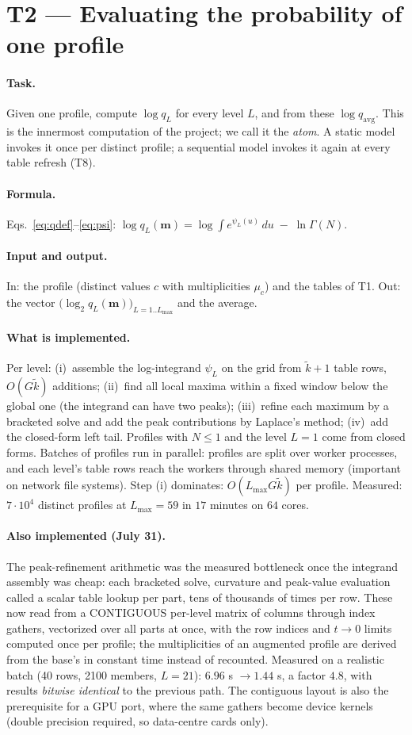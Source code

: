 \documentclass[11pt]{article}
\newcommand{\prof}{\mathbf{m}}
\newcommand{\field}[1]{\paragraph{#1.}}
\begin{document}
\section{T2 --- Evaluating the probability of one profile}

\field{Task}
Given one profile, compute $\log q_L$ for every level $L$, and from
these $\log q_{\mathrm{avg}}$.  This is the innermost computation of
the project; we call it the \emph{atom}.  A static model invokes it
once per distinct profile; a sequential model invokes it again at
every table refresh (T8).

\field{Formula}
Eqs.~\eqref{eq:qdef}--\eqref{eq:psi}:
$\log q_L(\prof) = \log \int e^{\psi_L(u)}\,du \;-\; \ln \Gamma(N)$.

\field{Input and output}
In: the profile (distinct values $c$ with multiplicities $\mu_c$)
and the tables of T1.  Out: the vector
$\bigl(\log_2 q_L(\prof)\bigr)_{L = 1..L_{\max}}$ and the average.

\field{What is implemented}
Per level: (i)~assemble the log-integrand $\psi_L$ on the grid from
$\tilde k + 1$ table rows, $O(G \tilde k)$ additions; (ii)~find all
local maxima within a fixed window below the global one (the
integrand can have two peaks); (iii)~refine each maximum by a
bracketed solve and add the peak contributions by Laplace's method;
(iv)~add the closed-form left tail.  Profiles with $N \le 1$ and the
level $L = 1$ come from closed forms.  Batches of profiles run in
parallel: profiles are split over worker processes, and each level's
table rows reach the workers through shared memory (important on
network file systems).  Step (i) dominates: $O(L_{\max} G \tilde k)$
per profile.  Measured: $7\cdot 10^4$ distinct profiles at
$L_{\max} = 59$ in $17$ minutes on $64$ cores.

\field{Also implemented (July 31)}
The peak-refinement arithmetic was the measured bottleneck once the
integrand assembly was cheap: each bracketed solve, curvature and
peak-value evaluation called a scalar table lookup per part, tens of
thousands of times per row.  These now read from a CONTIGUOUS
per-level matrix of columns through index gathers, vectorized over
all parts at once, with the row indices and $t\to0$ limits computed
once per profile; the multiplicities of an augmented profile are
derived from the base's in constant time instead of recounted.
Measured on a realistic batch (40 rows, 2100 members, $L=21$):
$6.96$ s $\to 1.44$ s, a factor $4.8$, with results \emph{bitwise
identical} to the previous path.  The contiguous layout is also the
prerequisite for a GPU port, where the same gathers become device
kernels (double precision required, so data-centre cards only).
\end{document}
